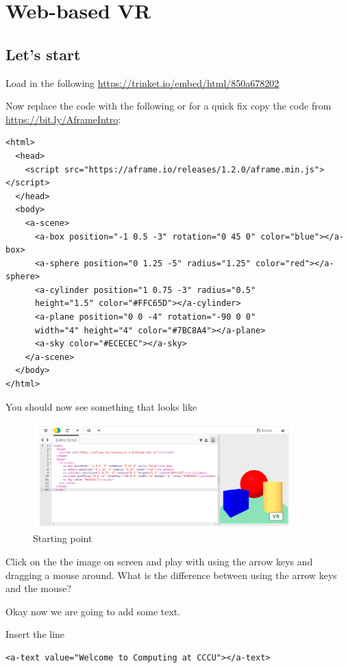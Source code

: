 
\chapter{Web-based VR}

\section{Let's start}
Load in the following \url{https://trinket.io/embed/html/850a678202}

Now replace the code with the following or for a quick fix copy the code from \url{https://bit.ly/AframeIntro}:

\begin{lstlisting}
<html>
  <head>
    <script src="https://aframe.io/releases/1.2.0/aframe.min.js"></script>
  </head>
  <body>
    <a-scene>
      <a-box position="-1 0.5 -3" rotation="0 45 0" color="blue"></a-box>
      <a-sphere position="0 1.25 -5" radius="1.25" color="red"></a-sphere>
      <a-cylinder position="1 0.75 -3" radius="0.5"
      height="1.5" color="#FFC65D"></a-cylinder>
      <a-plane position="0 0 -4" rotation="-90 0 0" 
      width="4" height="4" color="#7BC8A4"></a-plane>
      <a-sky color="#ECECEC"></a-sky>
    </a-scene>
  </body>
</html>
\end{lstlisting}

You should now see something that looks like 

\begin{figure}
    \centering
    \includegraphics[width=10cm]{chapters/chapter1/figures/schools4.png}
    \caption{Starting point}
    \label{fig:schools4}
\end{figure}

Click on the the image on screen and play with using the arrow keys and dragging a mouse around. What is the difference between using the arrow keys and the mouse?

Okay now we are going to add some text.

Insert the line
\begin{lstlisting}
<a-text value="Welcome to Computing at CCCU"></a-text>
\end{lstlisting}


